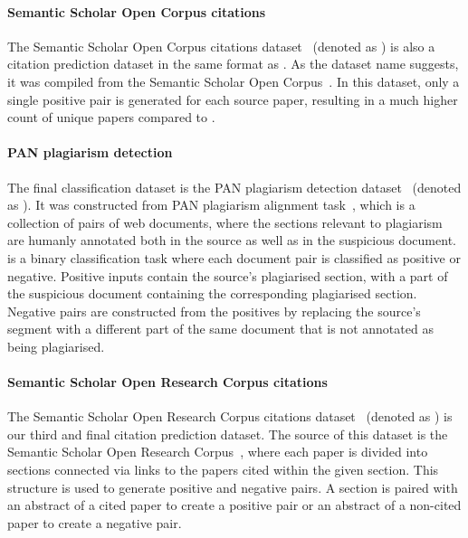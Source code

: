 \paragraph{Semantic Scholar Open Corpus citations} The Semantic Scholar Open
Corpus citations dataset~\citep{zhou2020multilevel} (denoted as ) is
also a citation prediction dataset in the same format as . As the
dataset name suggests, it was compiled from the Semantic Scholar Open
Corpus~\citep{bhagavatula2018content}. In this dataset, only a single positive
pair is generated for each source paper, resulting in a much higher count of
unique papers compared to .

\paragraph{PAN plagiarism detection} The final classification dataset is the
PAN plagiarism detection dataset~\citep{zhou2020multilevel} (denoted as
). It was constructed from PAN plagiarism alignment
task~\citep{potthast2013overview}, which is a collection of pairs of web
documents, where the sections relevant to plagiarism are humanly annotated both
in the source as well as in the suspicious document.  is a binary
classification task where each document pair is classified as positive or
negative. Positive inputs contain the source's plagiarised section, with a part of
the suspicious document containing the corresponding plagiarised section.
Negative pairs are constructed from the positives by replacing the source's
segment with a different part of the same document that is not annotated as being
plagiarised.

\paragraph{Semantic Scholar Open Research Corpus citations} The Semantic
Scholar Open Research Corpus citations dataset~\citep{zhou2020multilevel}
(denoted as ) is our third and final citation prediction dataset.
The source of this dataset is the Semantic Scholar Open Research
Corpus~\citep{lo2019s2orc}, where each paper is divided into sections 
connected via links to the papers cited within the given section. This structure is
used to generate positive and negative pairs. A section is paired with an
abstract of a cited paper to create a positive pair or an abstract of
a non-cited paper to create a negative pair.


